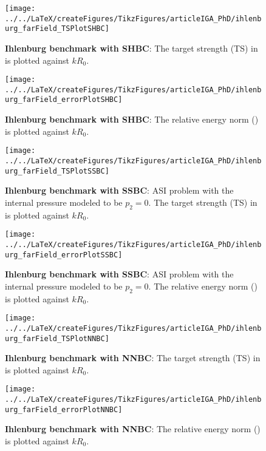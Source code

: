 \begin{figure}
	\centering
	\texttt{[image: ../../LaTeX/createFigures/TikzFigures/articleIGA\_PhD/ihlenburg\_farField\_TSPlotSHBC]}
	\caption{\textbf{Ihlenburg benchmark with SHBC}: The target strength (TS) in  is plotted against $kR_0$.}
	\label{Fig2:TSPlotSHBC}
	\par\bigskip
	\par\bigskip
	\texttt{[image: ../../LaTeX/createFigures/TikzFigures/articleIGA\_PhD/ihlenburg\_farField\_errorPlotSHBC]}
	\caption{\textbf{Ihlenburg benchmark with SHBC}: The relative energy norm () is plotted against $kR_0$.}
	\label{Fig2:errorPlotSHBC}
\end{figure}
\begin{figure}
	\centering
	\texttt{[image: ../../LaTeX/createFigures/TikzFigures/articleIGA\_PhD/ihlenburg\_farField\_TSPlotSSBC]}
	\caption{\textbf{Ihlenburg benchmark with SSBC}: ASI problem with the internal pressure modeled to be $p_2=0$. The target strength (TS) in  is plotted against $kR_0$.}
	\label{Fig2:TSPlotSSBC}
	\par\bigskip
	\par\bigskip
	\texttt{[image: ../../LaTeX/createFigures/TikzFigures/articleIGA\_PhD/ihlenburg\_farField\_errorPlotSSBC]}
	\caption{\textbf{Ihlenburg benchmark with SSBC}: ASI problem with the internal pressure modeled to be $p_2=0$. The relative energy norm () is plotted against $kR_0$.}
	\label{Fig2:errorPlotSSBC}
\end{figure}
\begin{figure}
	\centering
	\texttt{[image: ../../LaTeX/createFigures/TikzFigures/articleIGA\_PhD/ihlenburg\_farField\_TSPlotNNBC]}
	\caption{\textbf{Ihlenburg benchmark with NNBC}: The target strength (TS) in  is plotted against $kR_0$.}
	\label{Fig2:TSPlotNNBC}
	\par\bigskip
	\par\bigskip
	\texttt{[image: ../../LaTeX/createFigures/TikzFigures/articleIGA\_PhD/ihlenburg\_farField\_errorPlotNNBC]}
	\caption{\textbf{Ihlenburg benchmark with NNBC}: The relative energy norm () is plotted against $kR_0$.}
	\label{Fig2:errorPlotNNBC}
\end{figure}
